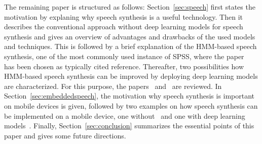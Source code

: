 The remaining paper is structured as follows: Section~\ref{sec:speech} first states the motivation by explaning why speech synthesis is a useful technology. Then it describes the conventional approach without deep learning models for speech synthesis and gives an overview of advantages and drawbacks of the used models and techniques. This is followed by a brief explanation of the \ac{HMM}-based speech synthesis, one of the most commonly used instance of \ac{SPSS}, where the paper~\cite{black:statistical} has been chosen as typically cited reference. Thereafter, two possibilities how \ac{HMM}-based speech synthesis can be improved by deploying deep learning models are characterized. For this purpose, the papers~\cite{zen:deepstatistical} and~\cite{hashimoto:effect} are reviewed. In Section~\ref{sec:embeddedspeech}, the motivation why speech synthesis is important on mobile devices is given, followed by two examples on how speech synthesis can be implemented on a mobile device, one without~\cite{toth:optimizing} and one with deep learning models~\cite{boros:robust}. Finally, Section~\ref{sec:conclusion} summarizes the essential points of this paper and gives some future directions.